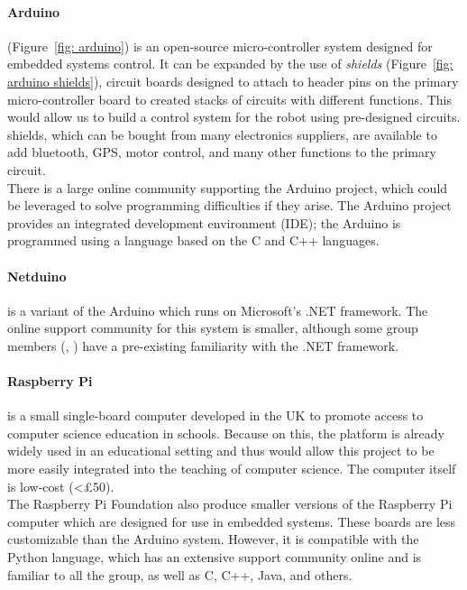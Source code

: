         \paragraph{\gls{Arduino}} (Figure~\ref{fig: arduino}) is an open-source micro-controller system designed for embedded systems control. It can be expanded by the use of \emph{\glspl{shield}} (Figure~\ref{fig: arduino shields}), circuit boards designed to attach to header pins on the primary micro-controller board to created stacks of circuits with different functions. This would allow us to build a control system for the robot using pre-designed circuits. \Glspl{shield}, which can be bought from many electronics suppliers, are available to add bluetooth, GPS, motor control, and many other functions to the primary circuit.\\
        There is a large online community supporting the \gls{Arduino} project, which could be leveraged to solve programming difficulties if they arise. The \gls{Arduino} project provides an integrated development environment (IDE); the \gls{Arduino} is programmed using a language based on the C and C++ languages.
        \paragraph{Netduino} is a variant of the \gls{Arduino} which runs on Microsoft's .NET framework. The online support community for this system is smaller, although some group members (\AG, \LY) have a pre-existing familiarity with the .NET framework.\\

        \paragraph{Raspberry Pi} is a small single-board computer developed in the UK to promote access to computer science education in schools. Because on this, the platform is already widely used in an educational setting and thus would allow this project to be more easily integrated into the teaching of computer science. The computer itself is low-cost (<\pounds{50}).\\
        The Raspberry Pi Foundation also produce smaller versions of the Raspberry Pi computer which are designed for use in embedded systems. These boards are less customizable than the Arduino system. However, it is compatible with the Python language, which has an extensive support community online and is familiar to all the group, as well as C, C++, Java, and others.

